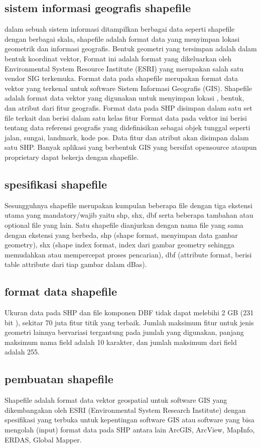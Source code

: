 \subsection {sistem informasi geografis shapefile}
dalam sebuah sistem informasi ditampilkan berbagai data seperti shapefile dengan berbagai skala, shapefile adalah format data yang menyimpan lokasi geometrik dan informasi geografis.
Bentuk geometri yang tersimpan adalah dalam  bentuk koordinat vektor, Format ini adalah format yang dikeluarkan oleh Environmental System Resource Institute (ESRI)
yang merupakan salah satu vendor SIG terkemuka.
Format data pada shapefile merupakan format data vektor yang terkenal untuk software Sistem Informasi Geografis (GIS).
Shapefile adalah format data vektor yang digunakan untuk menyimpan lokasi , bentuk, dan atribut dari fitur geografis. 
Format data pada SHP disimpan dalam satu set file terkait dan berisi dalam satu kelas fitur 
Format data pada vektor ini berisi tentang data referensi geografis yang didefinisikan sebagai objek tunggal seperti jalan, sungai, landmark, kode pos.
Data fitur dan atribut akan disimpan dalam satu SHP. Banyak aplikasi yang berbentuk GIS yang bersifat opensource ataupun proprietary dapat bekerja dengan shapefile.
\subsection {spesifikasi shapefile}
Sesungguhnya shapefile merupakan kumpulan beberapa file dengan tiga ekstensi utama yang mandatory/wajib yaitu shp, shx, dbf serta beberapa tambahan atau optional file yang lain. 
Satu shapefile dianjurkan dengan nama file yang sama dengan ekstensi yang berbeda, shp (shape format, menyimpan data gambar geometry), shx (shape index format, index dari gambar geometry sehingga memudahkan atau mempercepat proses pencarian), 
dbf (attribute format, berisi table attribute dari tiap gambar dalam dBas).
\subsection {format data shapefile}
Ukuran data pada SHP dan file komponen DBF tidak dapat melebihi 2 GB (231 bit ), sekitar 70 juta fitur titik yang terbaik. 
Jumlah maksimum fitur untuk  jenis geometri lainnya bervariasi tergantung pada jumlah yang digunakan, panjang maksimum nama field adalah 10 karakter, dan jumlah maksimum dari field adalah 255.
\subsection {pembuatan shapefile}
Shapefile adalah format data vektor geospatial untuk software GIS yang dikembangakan oleh ESRI (Environmental System Research Institute)
dengan spesifikasi yang terbuka untuk kepentingan software GIS atau software yang bisa mengolah (input) format data pada SHP antara lain ArcGIS, ArcView, MapInfo, ERDAS, Global Mapper.
